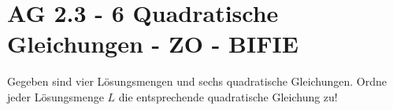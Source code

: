\section{AG 2.3 - 6 Quadratische Gleichungen  - ZO - BIFIE}

\begin{beispiel}[AG 2.3]{1} %
	
				Gegeben sind vier Lösungsmengen und sechs quadratische Gleichungen. Ordne jeder Lösungsmenge $L$ die entsprechende quadratische Gleichung zu!
\end{beispiel}